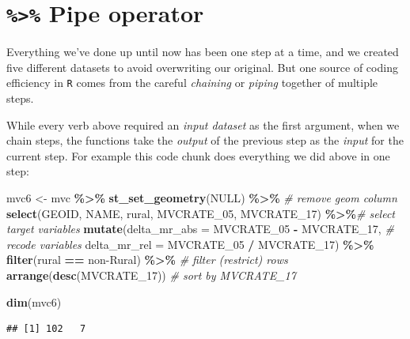 \documentclass[
]{book}
\newenvironment{Shaded}{\begin{snugshade}}{\end{snugshade}}
\newcommand{\AttributeTok}[1]{\textcolor[rgb]{0.13,0.29,0.53}{#1}}
\newcommand{\CommentTok}[1]{\textcolor[rgb]{0.56,0.35,0.01}{\textit{#1}}}
\newcommand{\ConstantTok}[1]{\textcolor[rgb]{0.56,0.35,0.01}{#1}}
\newcommand{\FunctionTok}[1]{\textcolor[rgb]{0.13,0.29,0.53}{\textbf{#1}}}
\newcommand{\NormalTok}[1]{#1}
\newcommand{\OtherTok}[1]{\textcolor[rgb]{0.56,0.35,0.01}{#1}}
\newcommand{\SpecialCharTok}[1]{\textcolor[rgb]{0.81,0.36,0.00}{\textbf{#1}}}
\newcommand{\StringTok}[1]{\textcolor[rgb]{0.31,0.60,0.02}{#1}}
\begin{document}
\hypertarget{pipe-operator}{%
\section{\texorpdfstring{\texttt{\%\textgreater{}\%} Pipe operator}{\%\textgreater\% Pipe operator}}\label{pipe-operator}}

Everything we've done up until now has been one step at a time, and we created five different datasets to avoid overwriting our original. But one source of coding efficiency in \texttt{R} comes from the careful \emph{chaining} or \emph{piping} together of multiple steps.

While every verb above required an \emph{input dataset} as the first argument, when we chain steps, the functions take the \emph{output} of the previous step as the \emph{input} for the current step. For example this code chunk does everything we did above in one step:

\begin{Shaded}
\begin{Highlighting}[]
\NormalTok{mvc6 }\OtherTok{\textless{}{-}}\NormalTok{ mvc }\SpecialCharTok{\%\textgreater{}\%}
  \FunctionTok{st\_set\_geometry}\NormalTok{(}\ConstantTok{NULL}\NormalTok{) }\SpecialCharTok{\%\textgreater{}\%}                             \CommentTok{\# remove geom column}
  \FunctionTok{select}\NormalTok{(GEOID, NAME, rural, MVCRATE\_05, MVCRATE\_17) }\SpecialCharTok{\%\textgreater{}\%}\CommentTok{\# select target variables}
  \FunctionTok{mutate}\NormalTok{(}\AttributeTok{delta\_mr\_abs =}\NormalTok{ MVCRATE\_05 }\SpecialCharTok{{-}}\NormalTok{ MVCRATE\_17,        }\CommentTok{\# recode variables}
        \AttributeTok{delta\_mr\_rel =}\NormalTok{ MVCRATE\_05 }\SpecialCharTok{/}\NormalTok{ MVCRATE\_17) }\SpecialCharTok{\%\textgreater{}\%}
  \FunctionTok{filter}\NormalTok{(rural }\SpecialCharTok{==} \StringTok{\textquotesingle{}non{-}Rural\textquotesingle{}}\NormalTok{) }\SpecialCharTok{\%\textgreater{}\%}                      \CommentTok{\# filter (restrict) rows}
  \FunctionTok{arrange}\NormalTok{(}\FunctionTok{desc}\NormalTok{(MVCRATE\_17))                             }\CommentTok{\# sort by MVCRATE\_17}

\FunctionTok{dim}\NormalTok{(mvc6)}
\end{Highlighting}
\end{Shaded}

\begin{verbatim}
## [1] 102   7
\end{verbatim}
\end{document}
